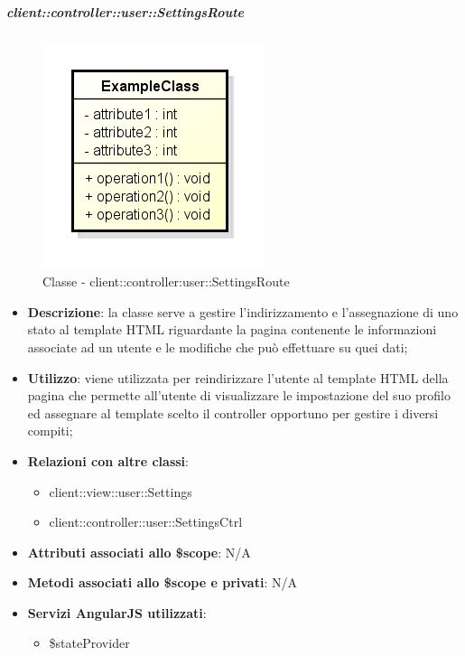 		\subparagraph{client::controller::user::SettingsRoute} %
		\label{subp:bdsm_app_client_controller_user_settingsroute}
			\begin{figure}[htbp]
				\centering
				\centerline{\includegraphics[scale=0.7]{./images/client/classes/example_class.png}}
				\caption{Classe - client::controller:user::SettingsRoute}
			\end{figure}
			\begin{itemize}
				\item \textbf{Descrizione}: la classe serve a gestire l'indirizzamento e l'assegnazione di uno stato al template HTML riguardante la pagina contenente le informazioni associate ad un utente e le modifiche che può effettuare su quei dati;
				\item \textbf{Utilizzo}: viene utilizzata per reindirizzare l'utente al template HTML della pagina che permette all'utente di visualizzare le impostazione del suo profilo ed assegnare al template scelto il controller opportuno per gestire i diversi compiti;
				\item \textbf{Relazioni con altre classi}:
					\begin{itemize}
						\item client::view::user::Settings
						\item client::controller::user::SettingsCtrl
					\end{itemize}
				\item \textbf{Attributi associati allo \$scope}: N/A
				\item \textbf{Metodi associati allo \$scope e privati}: N/A
				\item \textbf{Servizi AngularJS utilizzati}:
					\begin{itemize}
						\item \$stateProvider
					\end{itemize}
			\end{itemize}

